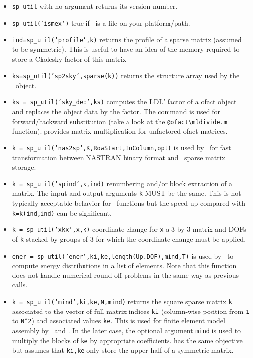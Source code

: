 \begin{itemize}
\item {\tt sp\_util} with no argument returns its version number.

\item {\tt sp\_util('ismex')} true if \sputil\ is a  file on your platform/path.

\item {\tt ind=sp\_util('profile',k)} returns the profile of a sparse matrix (assumed to be symmetric). This is useful to have an idea of the memory required to store a Cholesky factor of this matrix.

\item {\tt ks=sp\_util('sp2sky',sparse(k))} returns the structure array used by the \ofact\ object.

\item {\tt ks = sp\_util('sky\_dec',ks)} computes the LDL' factor of a ofact object and replaces the object data by the factor. The  command is used for forward/backward substitution (take a look at the {\tt \verb+@+ofact\verb+\+mldivide.m} function).   provides matrix multiplication for unfactored ofact matrices. 

\item {\tt k = sp\_util('nas2sp',K,RowStart,InColumn,opt)} is used by \nasread\ for fast transformation between NASTRAN binary format and \matlab\ sparse matrix storage.

\item {\tt k = sp\_util('spind',k,ind)} renumbering and/or block extraction of a matrix. The input and output arguments {\tt k} MUST be the same. This is not typically acceptable behavior for \matlab\ functions but the speed-up compared with {\tt k=k(ind,ind)} can be significant.

\item {\tt k = sp\_util('xkx',x,k)} coordinate change for {\tt x} a 3 by 3 matrix and DOFs of {\tt k} stacked by groups of 3 for which the coordinate change must be applied.

\item {\tt ener = sp\_util('ener',ki,ke,length(Up.DOF),mind,T)} is used by \upcom\ to compute energy distributions in a list of elements. Note that this function does not handle numerical round-off problems in the same way as previous calls.

\item {\tt k = sp\_util('mind',ki,ke,N,mind)} returns the square sparse matrix {\tt k} associated to the vector of full matrix indices {\tt ki} (column-wise position from {\tt 1} to {\tt \verb|N^2|}) and associated values {\tt ke}. This is used for finite element model assembly by \femk\ and \upcom. In the later case, the optional argument {\tt mind} is used to multiply the blocks of {\tt ke} by appropriate coefficients.   has the same objective but assumes that {\tt ki,ke} only store the upper half of a symmetric matrix.


\end{itemize}
